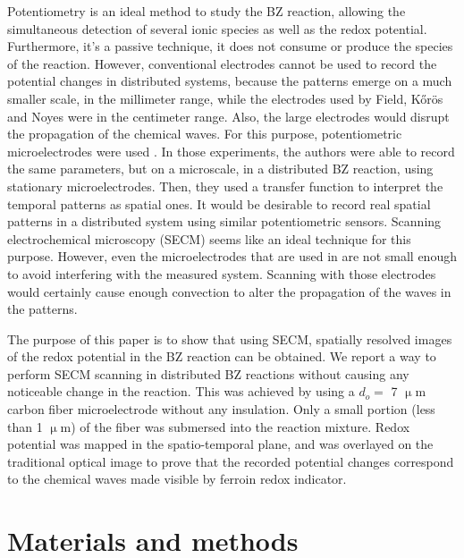 \documentclass[3p, twocolumn]{elsarticle}
\begin{document}
Potentiometry is an ideal method to study the BZ reaction, allowing the simultaneous detection of several ionic species as well as the redox potential.
Furthermore, it's a passive technique, it does not consume or produce the species of the reaction.
However, conventional electrodes cannot be used to record the potential changes in distributed systems, because the patterns emerge on a much smaller scale, in the millimeter range, while the electrodes used by Field, Kőrös and Noyes were in the centimeter range.
Also, the large electrodes would disrupt the propagation of the chemical waves.
For this purpose, potentiometric microelectrodes were used \cite{hess2, hess3}.
In those experiments, the authors were able to record the same parameters, but on a microscale, in a distributed BZ reaction, using stationary microelectrodes.
Then, they used a transfer function to interpret the temporal patterns as spatial ones.
It would be desirable to record real spatial patterns in a distributed system using similar potentiometric sensors.
Scanning electrochemical microscopy (SECM) seems like an ideal technique for this purpose. 
However, even the microelectrodes that are used in \cite{hess2, hess3} are not small enough to avoid interfering with the measured system.
Scanning with those electrodes would certainly cause enough convection to alter the propagation of the waves in the patterns.

The purpose of this paper is to show that using SECM, spatially resolved images of the redox potential in the BZ reaction can be obtained.
We report a way to perform SECM scanning in distributed BZ reactions without causing any noticeable change in the reaction.
This was achieved by using a $d_o=$ 7 $\upmu$m carbon fiber microelectrode without any insulation.
Only a small portion (less than 1 $\upmu$m) of the fiber was submersed into the reaction mixture.
Redox potential was mapped in the spatio-temporal plane, and was overlayed on the traditional optical image to prove that the recorded potential changes correspond to the chemical waves made visible by ferroin redox indicator.

\section{Materials and methods}
\end{document}
